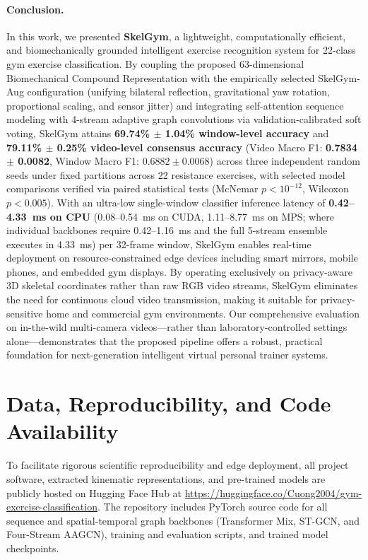 \documentclass[runningheads]{llncs}
\begin{document}
\paragraph{Conclusion.} In this work, we presented \textbf{SkelGym}, a lightweight, computationally efficient, and biomechanically grounded intelligent exercise recognition system for 22-class gym exercise classification. By coupling the proposed 63-dimensional Biomechanical Compound Representation with the empirically selected SkelGym-Aug configuration (unifying bilateral reflection, gravitational yaw rotation, proportional scaling, and sensor jitter) and integrating self-attention sequence modeling with 4-stream adaptive graph convolutions via validation-calibrated soft voting, SkelGym attains \textbf{69.74\% $\pm$ 1.04\% window-level accuracy} and \textbf{79.11\% $\pm$ 0.25\% video-level consensus accuracy} (Video Macro F1: \textbf{0.7834 $\pm$ 0.0082}, Window Macro F1: $0.6882 \pm 0.0068$) across three independent random seeds under fixed partitions across 22 resistance exercises, with selected model comparisons verified via paired statistical tests (McNemar $p < 10^{-12}$, Wilcoxon $p < 0.005$). With an ultra-low single-window classifier inference latency of \textbf{0.42--4.33~ms on CPU} (0.08--0.54~ms on CUDA, 1.11--8.77~ms on MPS; where individual backbones require 0.42--1.16~ms and the full 5-stream ensemble executes in 4.33~ms) per 32-frame window, SkelGym enables real-time deployment on resource-constrained edge devices including smart mirrors, mobile phones, and embedded gym displays. By operating exclusively on privacy-aware 3D skeletal coordinates rather than raw RGB video streams, SkelGym eliminates the need for continuous cloud video transmission, making it suitable for privacy-sensitive home and commercial gym environments. Our comprehensive evaluation on in-the-wild multi-camera videos---rather than laboratory-controlled settings alone---demonstrates that the proposed pipeline offers a robust, practical foundation for next-generation intelligent virtual personal trainer systems.

\section*{Data, Reproducibility, and Code Availability}
To facilitate rigorous scientific reproducibility and edge deployment, all project software, extracted kinematic representations, and pre-trained models are publicly hosted on Hugging Face Hub at \url{https://huggingface.co/Cuong2004/gym-exercise-classification}. The repository includes PyTorch source code for all sequence and spatial-temporal graph backbones (Transformer Mix, ST-GCN, and Four-Stream AAGCN), training and evaluation scripts, and trained model checkpoints. 
\end{document}
